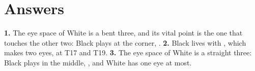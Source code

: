 \documentclass[border=0.5cm, varwidth=17cm]{standalone}
\begin{document}
	\section*{Answers}

	\textbf{1.} The eye space of White is a bent three, and its vital point is the one that
	touches the other two: Black plays at the corner, .
	\textbf{2.} Black lives with , which makes two eyes, at T17 and T19.
	\textbf{3.} The eye space of White is a straight three: Black plays in the middle,
	, and White has one eye at most.
	\medskip

	\begin{pgfgolayout}[columns = 3, width = natural]
		\begin{goban}[name = one]
		\end{goban}
		\begin{goban}[name = two]
		\end{goban}
		\begin{goban}[name = three]
		\end{goban}
	\end{pgfgolayout}
\end{document}
